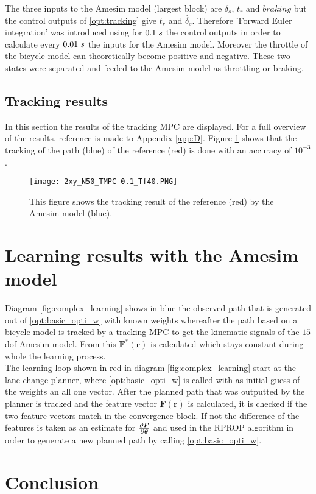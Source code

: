 The three inputs to the Amesim model (largest block) are $\delta_s$, $t_r$ and $braking$ but the control outputs of \ref{opt:tracking} give $\dot{t}_r$ and $\dot{\delta_s}$. Therefore 'Forward Euler integration' was introduced using for $0.1\hspace{1mm}s$ the control outputs in order to calculate every $0.01\hspace{1mm}s$ the inputs for the Amesim model. Moreover the throttle of the bicycle model can theoretically become positive and negative. These two states were separated and feeded to the Amesim model as throttling or braking. 


\subsection{Tracking results}
\label{s:tracking_results}
In this section the results of the tracking MPC are displayed. For a full overview of the results, reference is made to Appendix \ref{app:D}. Figure \ref{fig:xy_mpc} shows that the tracking of the path (blue) of the reference (red) is done with an accuracy of $10^{-3}$. 

\begin{figure}[h!]
	\centering
	\texttt{[image: 2xy\_N50\_TMPC 0.1\_Tf40.PNG]}
	\caption{This figure shows the tracking result of the reference (red) by the Amesim model (blue).}	
	\label{fig:xy_mpc}
\end{figure}












\section{Learning results with the Amesim model}
\label{s:complex_learning_results}

Diagram \ref{fig:complex_learning} shows in blue the observed path that is generated out of \ref{opt:basic_opti_w} with known weights whereafter the path based on a bicycle model is tracked by a tracking MPC to get the kinematic signals of the $15$ dof Amesim model. From this $\bm{F}^*(\bm{r})$ is calculated which stays constant during whole the learning process.\\

The learning loop shown in red in diagram \ref{fig:complex_learning} start at the lane change planner, where \ref{opt:basic_opti_w} is called with as initial guess of the weights an all one vector. After the planned path that was outputted by the planner is tracked and the feature vector $\bm{F}(\bm{r})$ is calculated, it is checked if the two feature vectors match in the convergence block. If not the difference of the features is taken as an estimate for $\pdv{\bm{F}}{\bm{\theta}}$ and used in the RPROP algorithm in order to generate a new planned path by calling \ref{opt:basic_opti_w}.


\section{Conclusion}

